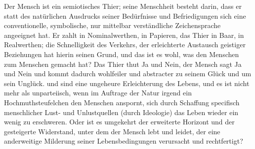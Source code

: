 Der Mensch ist ein semiotisches Thier; seine Menschheit besteht darin, dass er statt des natürlichen Ausdrucks seiner Bedürfnisse und Befriedigungen sich eine conventionelle, symbolische, nur mittelbar verständliche Zeichensprache angeeignet hat. Er zahlt in Nominalwerthen, in Papieren, das Thier in Baar, in Realwerthen; die Schnelligkeit des Verkehrs, der erleichterte Austausch geistiger Beziehungen hat hierin seinen Grund, und das ist es wohl, was den Menschen zum Menschen gemacht hat? Das Thier thut Ja und Nein, der Mensch sagt Ja und Nein und kommt dadurch wohlfeiler und abstracter zu seinem Glück und um sein Unglück.  und  sind eine ungeheure Erleichterung des Lebens, und es ist nicht mehr als unparteiisch, wenn im Auftrage der Natur irgend ein Hochmuthsteufelchen den Menschen anspornt, sich durch Schaffung specifisch menschlicher Lust- und Unlustquellen (durch Ideologie) das Leben wieder ein wenig zu erschweren. Oder ist es umgekehrt der erweiterte Horizont und der gesteigerte Widerstand, unter dem der Mensch lebt und leidet, der eine anderweitige Milderung seiner Lebensbedingungen verursacht und rechtfertigt?
\par

